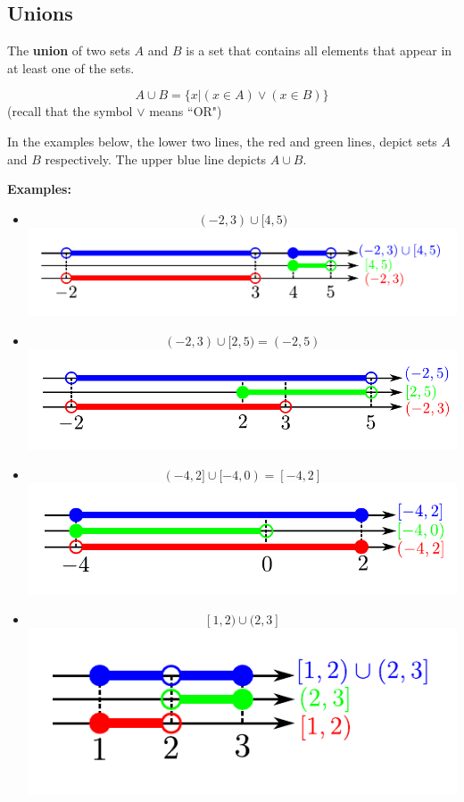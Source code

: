 \documentclass{article}
\begin{document}
\subsection*{Unions}

The {\bf union} of two sets \(A\) and \(B\) is a set that contains all elements that appear in at least one of the sets.

\[A \cup B = \{x | (x \in A) \vee (x \in B)\}\]
(recall that the symbol \(\vee\) means ``OR")

In the examples below, the lower two lines, the red and green lines, depict sets \(A\) and \(B\) respectively. The upper blue line depicts \(A \cup B\).

\textbf{Examples:}
\begin{itemize}
\item 
\[(-2, 3) \cup [4, 5)\]
\includegraphics[scale = 0.9]{union_example_1}
\item 
\[(-2, 3) \cup [2, 5) = (-2, 5)\]
\includegraphics[scale = 0.9]{union_example_2}
\item
\[(-4, 2] \cup [-4, 0) = [-4, 2]\]
\includegraphics[scale = 0.9]{union_example_3}
\item 
\[[1, 2) \cup (2, 3]\]
\includegraphics[scale = 0.9]{union_example_4}

\end{itemize}
\end{document}
